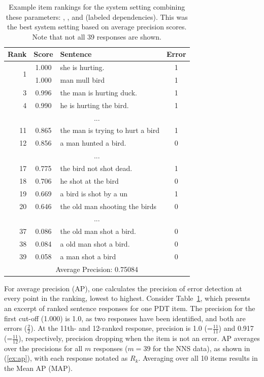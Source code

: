 \begin{table}[htb!]
\begin{center}
\setlength{\tabcolsep}{0.3em}
\begin{tabular}{|r|c|l|c|}
\hline
Rank & Score & Sentence & Error \\
\hline
\hline
\multirow{2}{*}{1} & 1.000 & she is hurting. & 1 \\
& 1.000 & man mull bird & 1 \\
\hline
3 & 0.996 & the man is hurting duck. & 1 \\
4 & 0.990 & he is hurting the bird. & 1 \\
\hline
\multicolumn{4}{|c|}{...} \\
\hline
11 & 0.865 & the man is trying to hurt a bird & 1 \\
12 & 0.856 & a man hunted a bird. & 0 \\
\hline
\multicolumn{4}{|c|}{...} \\
\hline
17 & 0.775 & the bird not shot dead.  & 1 \\
18 & 0.706 & he shot at the bird & 0 \\
19 & 0.669 & a bird is shot by a un & 1 \\
20 & 0.646 & the old man shooting the birds & 0 \\
\hline
\multicolumn{4}{|c|}{...} \\
\hline
37 & 0.086 & the old man shot a bird. & 0 \\
38 & 0.084 & a old man shot a bird. & 0 \\
39 & 0.058 & a man shot a bird & 0 \\
\hline
\hline
\multicolumn{4}{|c|}{Average Precision: 0.75084} \\
\hline
\end{tabular}
\caption{Example item rankings for the system setting combining these parameters: , , and  (labeled dependencies). This was the best system setting based on average precision scores. Note that not all 39 responses are shown.}
\label{tab:i10responses-avgprec}
\end{center}
\end{table}

For average precision (AP), one calculates the precision of error
detection at every point in the ranking, lowest to highest. Consider
Table~\ref{tab:i10responses-avgprec}, which presents an excerpt of ranked sentence
responses for one PDT item. The precision for
the first cut-off (1.000) is 1.0, as two responses have been
identified, and both are errors ($\frac{2}{2}$). At the 11th- and
12-ranked response, precision is 1.0 (=$\frac{11}{11}$) and 0.917
(=$\frac{11}{12}$), respectively, precision dropping when the item is
not an error.
AP averages over the precisions for all $m$ responses ($m=39$ for the
NNS data), as shown in (\ref{ex:ap}), with each response notated as
$R_k$.  Averaging over all 10 items results in the Mean AP (MAP).

